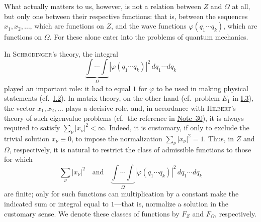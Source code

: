 \documentclass[fontsize=13pt,twoside,openany,headings=normal,parskip=false,bookmarkpackage=false,DIV=calc]{scrbook}
\begin{document}
What actually matters to us, however, is not a relation between $Z$ and $\Omega$ at all, but only one between their respective functions: that is, between the sequences $x_1,x_2,\ldots$, which are functions on $Z$, and the wave functions $\varphi(q_1\cdots q_k)$, which are functions on $\Omega$.
\hypertarget{origpage-16}{}%
For these alone enter into the problems of quantum mechanics.

In \textsc{Schrödinger}'s theory, the integral
\[
 \underbrace{\int\cdots\int}_{\Omega}|\varphi(q_1\cdots q_k)|^2\,dq_1\cdots dq_k
\]
played an important role: it had to equal $1$ for $\varphi$ to be used in making physical statements (cf.\ \hyperref[sec:I.2]{I.2}). In matrix theory, on the other hand (cf.\ problem \hyperref[eq:I.3.E1]{$E_1$} in \hyperref[sec:I.3]{I.3}), the vector $x_1,x_2,\ldots$ plays a decisive role, and, in accordance with \textsc{Hilbert}'s theory of such eigenvalue problems (cf.\ the reference in \hyperlink{note-30}{Note~30}), it is always required to satisfy $\sum_\nu|x_\nu|^2<\infty$. Indeed, it is customary, if only to exclude the trivial solution $x_\nu\equiv0$, to impose the normalization $\sum_\nu|x_\nu|^2=1$. Thus, in $Z$ and $\Omega$, respectively, it is natural to restrict the class of admissible functions to those for which
\[
 \sum_\nu|x_\nu|^2
 \quad\text{and}\quad
 \underbrace{\int\cdots\int}_{\Omega}|\varphi(q_1\cdots q_k)|^2\,dq_1\cdots dq_k
\]
are finite; only for such functions can multiplication by a constant make the indicated sum or integral equal to $1$---that is, normalize a solution in the customary sense. We denote these classes of functions by $F_Z$ and $F_\Omega$, respectively.
\end{document}
